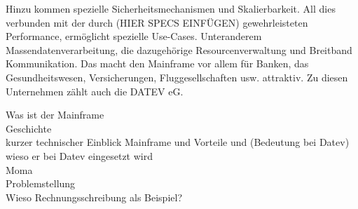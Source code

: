 Hinzu kommen spezielle Sicherheitsmechanismen und Skalierbarkeit.
All dies verbunden mit der durch (HIER SPECS EINFÜGEN) gewehrleisteten Performance, ermöglicht spezielle Use-Cases.
Unteranderem Massendatenverarbeitung, die dazugehörige Resourcenverwaltung und Breitband Kommunikation.
Das macht den Mainframe vor allem für Banken, das Gesundheitswesen, Versicherungen, Fluggesellschaften usw. attraktiv.
Zu diesen Unternehmen zählt auch die DATEV eG.
\cite{IBM.2014}


Was ist der Mainframe\\
Geschichte\\
kurzer technischer Einblick Mainframe und Vorteile und (Bedeutung bei Datev) \\
wieso er bei Datev eingesetzt wird \\
 Moma \\
 Problemstellung \\
 Wieso Rechnungsschreibung als Beispiel? \\